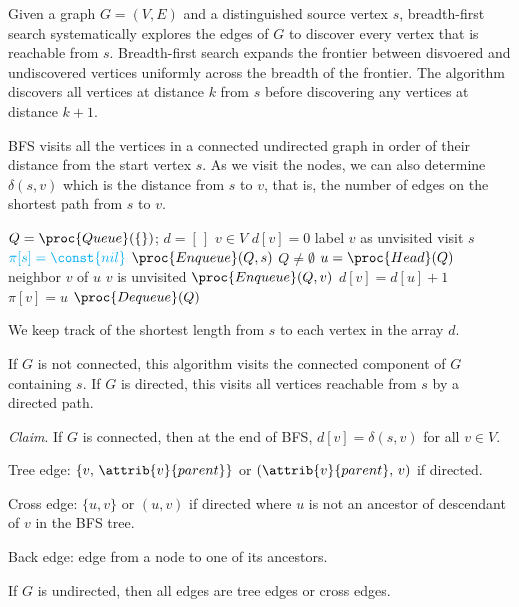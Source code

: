 Given a graph $G=(V,E)$ and a distinguished source vertex $s$, breadth-first search systematically explores the edges of $G$ to discover every vertex that is reachable from $s$. Breadth-first search expands the frontier between disvoered and undiscovered vertices uniformly across the breadth of the frontier. The algorithm discovers all vertices at distance $k$ from $s$ before discovering any vertices at distance $k+1$.

BFS visits all the vertices in a connected undirected graph in order of their distance from the start vertex $s$. As we visit the nodes, we can also determine $\delta(s,v)$ which is the distance from $s$ to $v$, that is, the number of edges on the shortest path from $s$ to $v$.

\begin{codebox}
    \li $Q = \proc{Queue}(\{\})$;\; $d = [ \, ]$ 
    \li \For $v \in V$ \Do
        \li $d[v] = 0$ 
        \li label $v$ as unvisited \End
    \li visit $s$
    \li $\color{cyan} \pi[s] = \const{nil}$ 
    \li $\proc{Enqueue}(Q,s)$
    \li \While $Q \neq \emptyset$ \Do
        \li $u = \proc{Head}(Q)$
        \li {} neighbor $v$ of $u$ \Do
            \li \If $v$ is unvisited \Then
                \li $\proc{Enqueue}(Q,v)$
                \li $d[v] = d[u] + 1$
                \li \color{cyan} $\pi[v] = u$  \End
            \End
        \li $\proc{Dequeue}(Q)$
\end{codebox}

We keep track of the shortest length from $s$ to each vertex in the array $d$.

If $G$ is not connected, this algorithm visits the connected component of $G$ containing $s$. If $G$ is directed, this visits all vertices reachable from $s$ by a directed path.

\textit{Claim}. If $G$ is connected, then at the end of BFS, $d[v] = \delta(s,v)$ for all $v \in V$.

Tree edge: $\{v,\, \attrib{v}{parent}\}$ or $(\attrib{v}{parent},\, v)$ if directed.

Cross edge: $\{ u,v \}$ or $(u,v)$ if directed where $u$ is not an ancestor of descendant of $v$ in the BFS tree.

Back edge: edge from a node to one of its ancestors.

\begin{lemma}
    If $G$ is undirected, then all edges are tree edges or cross edges.
\end{lemma}

